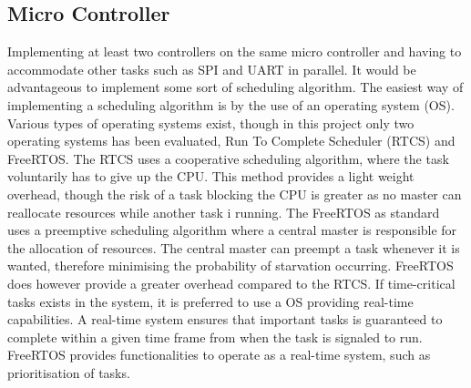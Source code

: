 \documentclass[../../main.tex]{subfiles}
\begin{document}
\subsection*{Micro Controller}
Implementing at least two controllers on the same micro controller and having to accommodate other tasks such as SPI and UART in parallel. It would be advantageous to implement some sort of scheduling algorithm. The easiest way of implementing a scheduling algorithm is by the use of an operating system (OS). Various types of operating systems exist, though in this project only two operating systems has been evaluated, Run To Complete Scheduler (RTCS) and FreeRTOS. The RTCS uses a cooperative scheduling algorithm, where the task voluntarily has to give up the CPU. This method provides a light weight overhead, though the risk of a task blocking the CPU is greater as no master can reallocate resources while another task i running. 
The FreeRTOS as standard uses a preemptive scheduling algorithm where a central master is responsible for the allocation of resources. The central master can preempt a task whenever it is wanted, therefore minimising the probability of starvation occurring. FreeRTOS does however provide a greater overhead compared to the RTCS. If time-critical tasks exists in the system, it is preferred to use a OS providing real-time capabilities. A real-time system ensures that important tasks is guaranteed to complete within a given time frame from when the task is signaled to run. FreeRTOS provides functionalities to operate as a real-time system, such as prioritisation of tasks.   





\end{document}
